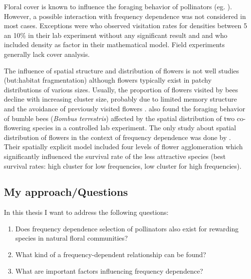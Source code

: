 Floral cover is known to influence the foraging behavior of pollinators (eg. \citealt{kunin1993sex,essenberg2012explaining}). However, a possible interaction with  frequency dependence was not considered in most cases. Exceptions were \cite{smithson1997density} who observed visitation rates for densities between 5 an 10\% in their lab experiment without any significant result and \cite{kunin1996pollinator} and \cite{song2014adaptive} who included density as factor in their mathematical model. Field experiments generally lack cover analysis. 

The influence of spatial structure and distribution of flowers is not well studies (but:habitat fragmentation) although flowers typically exist in patchy distributions of various sizes. Usually, the proportion of flowers visited by bees decline with increasing cluster size, probably due to limited memory structure and the avoidance of previously visited flowers \citep{goulson2000pollinators}. \cite{geslin2014effect} also found the foraging behavior of bumble bees (\textit{Bombus terrestris}) affected by the spatial distribution of two co-flowering species in a controlled lab experiment. The only study about spatial distribution of flowers in the context of frequency dependence was done by \cite{hanoteaux2013effects}. Their spatially explicit model included four levels of flower agglomeration which significantly influenced the survival rate of the less attractive species (best survival rates: high cluster for low frequencies, low cluster for high frequencies). 


\subsection*{My approach/Questions}
In this thesis I want to address the following questions: 

\begin{enumerate}
	\item Does frequency dependence selection of pollinators also exist for rewarding species in natural floral communities? \\
	\item	What kind of a frequency-dependent relationship can be found?\\
	\item	What are important factors influencing frequency dependence?\\
\end{enumerate}

